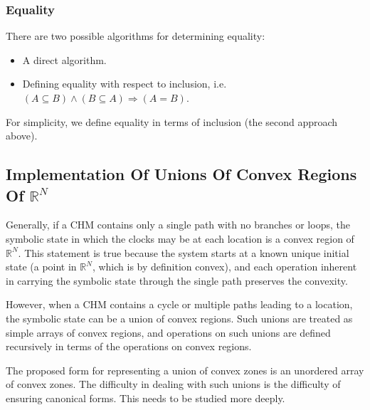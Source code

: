\subsubsection{Equality}
\label{siop0:sirn0:sequ0}

There are two possible algorithms for determining equality:

\begin{itemize}
\item A direct algorithm.
\item Defining equality with respect to inclusion, i.e.
      $(A \subseteq B) \wedge (B \subseteq A) \Longrightarrow (A = B)$.
\end{itemize}

For simplicity, we define equality in terms of inclusion (the second
approach above).


\subsection[Implementation Of Unions Of Convex Regions Of $\mathbb{R}^N$]
           {Implementation Of Unions Of Convex Regions Of \mbox{\boldmath $\mathbb{R}^N$}}
\label{siop0:surn0}

Generally, if a CHM contains only a single path with no branches or loops,
the symbolic state in which the clocks may be at each location is a convex
region of $\mathbb{R}^N$.  This statement is true because the system starts 
at a known unique initial state (a point in $\mathbb{R}^N$, which is 
by definition convex), and each 
operation inherent in carrying the symbolic state through the single path
preserves the convexity.

However, when a CHM contains a cycle or multiple paths leading to a location,
the symbolic state can be a union of convex regions.  Such unions are 
treated as simple arrays of convex regions, and operations on such unions
are defined recursively in terms of the operations on convex regions.

The proposed form for representing a union of convex zones is an unordered array of
convex zones.  The difficulty in dealing with such unions is the difficulty of 
ensuring canonical forms.  This needs to be studied more deeply.



